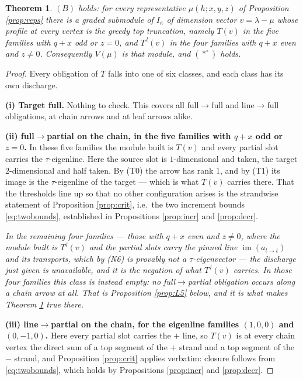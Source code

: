 \documentclass[reqno]{amsart}
\theoremstyle{plain}
\newtheorem{theorem}{Theorem}[section]
\theoremstyle{definition}
\DeclareMathOperator{\im}{im}
\newcommand{\la}{\lambda}
\newcommand{\ka}{\kappa}
\begin{document}
\begin{theorem}\label{thm:B}
$(B)$ holds: for every representative $\mu(h;x,y,z)$ of Proposition
\ref{prop:reps} there is a graded submodule of $I_\ka$ of dimension vector
$v=\la-\mu$ whose profile at every vertex is the greedy top truncation, namely
$T(v)$ in the five families with $q+x$ odd or $z=0$, and $T^{\,l}(v)$ in the
four families with $q+x$ even and $z\ne0$.  Consequently $V(\mu)$ is that
module, and $(*^\circ)$ holds.
\end{theorem}

\begin{proof}
Every obligation of $T$ falls into one of six classes, and each class has its
own discharge.

\smallskip\noindent
\textbf{(i) Target full.}  Nothing to check.  This covers all full$\to$full and
line$\to$full obligations, at chain arrows and at leaf arrows alike.

\smallskip\noindent
\textbf{(ii) full$\to$partial on the chain, in the five families with $q+x$
odd or $z=0$.}  In these five families the module built is $T(v)$ and every
partial slot carries the $\tau$-eigenline.  Here the source slot is
$1$-dimensional and taken, the target $2$-dimensional and half taken.  By (T0)
the arrow has rank $1$, and by (T1) its image is the $\tau$-eigenline of the
target --- which is what $T(v)$ carries there.  That the thresholds line up so
that no other configuration arises is the strandwise statement of Proposition
\ref{prop:crit}, i.e.\ the two increment bounds \eqref{eq:twobounds},
established in Propositions \ref{prop:incr} and \ref{prop:decr}.

\emph{In the remaining four families --- those with $q+x$ even and $z\ne0$,
where the module built is $T^{\,l}(v)$ and the partial slots carry the pinned
line $\im(a_{l\to t})$ and its transports, which by \textup{(N6)} is provably
\emph{not} a $\tau$-eigenvector --- the discharge just given is unavailable,
and it is the negation of what $T^{\,l}(v)$ carries.  In those four families
this class is instead \emph{empty}: no full$\to$partial obligation occurs
along a chain arrow at all.  That is Proposition \ref{prop:L5}
below, and it is what makes Theorem \textup{\ref{thm:B}} true there.}

\smallskip\noindent
\textbf{(iii) line$\to$partial on the chain, for the eigenline families
$(1,0,0)$ and $(0,-1,0)$.}  Here every partial slot carries the $+$ line, so
$T(v)$ is at every chain vertex the direct sum of a top segment of the $+$
strand and a top segment of the $-$ strand, and Proposition \ref{prop:crit}
applies verbatim: closure follows from \eqref{eq:twobounds}, which holds by
Propositions \ref{prop:incr} and \ref{prop:decr}.


\end{proof}
\end{document}
